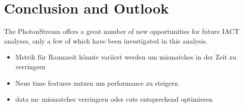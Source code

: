 \chapter{Conclusion and Outlook}
%
The PhotonStream offers a great number of new opportunities for future IACT
analyses, only a few of which have been investigated in this analysis.

\begin{itemize}
  \item Metrik für Raumzeit könnte variiert werden um mismatches in der Zeit zu verringern
  \item Neue time features nutzen um performance zu steigern
  \item data mc mismatches verringern oder cuts entsprechend optimieren
\end{itemize}
